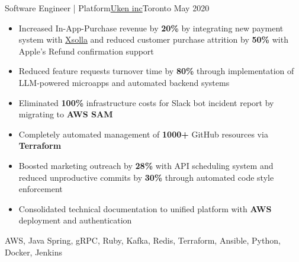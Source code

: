 %
%
%
\begin{experiences}
  \experienceCurrent
    {Software Engineer | Platform}{\href{https://uken.com}{Uken inc}}{Toronto}
    {May 2020} {
                    \begin{itemize}
                        \setlength\itemsep{0.6em}

                        \item Increased In-App-Purchase revenue by \textbf{20\%} by integrating new payment system with \href{https://xsolla.com}{Xsolla} and reduced customer purchase attrition by \textbf{50\%} with Apple's Refund confirmation support

                        \item Reduced feature requests turnover time by \textbf{80\%} through implementation of LLM-powered microapps and automated backend systems

                        \item Eliminated \textbf{100\%} infrastructure costs for Slack bot incident report by migrating to \textbf{AWS SAM}

                        \item Completely automated management of \textbf{1000+} GitHub resources via \textbf{Terraform}

                        \item Boosted marketing outreach by \textbf{28\%} with API scheduling system and reduced unproductive commits by \textbf{30\%} through automated code style enforcement

                        \item Consolidated technical documentation to unified   platform with \textbf{AWS} deployment and   authentication
                    \end{itemize}
                    }
                    {AWS, Java Spring, gRPC, Ruby, Kafka, Redis, Terraform, Ansible, Python, Docker, Jenkins}
\end{experiences}
